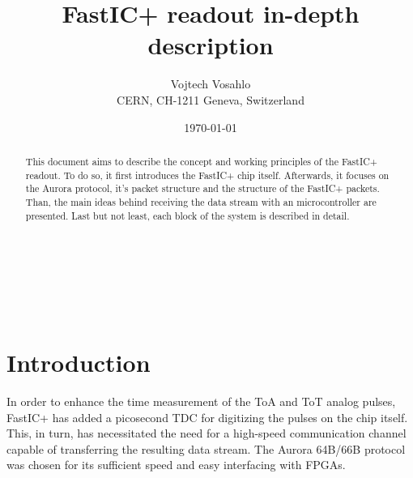 \documentclass{cernatsnote}
\title{FastIC+ readout in-depth description}
\author{
	Vojtech Vosahlo \; \\		
	CERN, CH-1211 Geneva, Switzerland
}
\date{\today}
\begin{document}
\maketitle

\begin{abstract}
This document aims to describe the concept and working principles of the FastIC+ readout. To do so, it first introduces the FastIC+ chip itself. Afterwards, it focuses on the Aurora protocol, it's packet structure and the structure of the FastIC+ packets. Than, the main ideas behind receiving the data stream with an microcontroller are presented. Last but not least, each block of the system is described in detail.
\end{abstract}
\\ \\ \\ 

\newpage
\begingroup
\color{black}
\tableofcontents
\endgroup

\pagebreak

\section{Introduction}
In order to enhance the time measurement of the ToA and ToT analog pulses, FastIC+ has added a picosecond TDC for digitizing the pulses on the chip itself. This, in turn, has necessitated the need for a high-speed communication channel capable of transferring the resulting data stream. The Aurora 64B/66B protocol was chosen for its sufficient speed and easy interfacing with FPGAs.









\clearpage
\FloatBarrier


\end{document}
